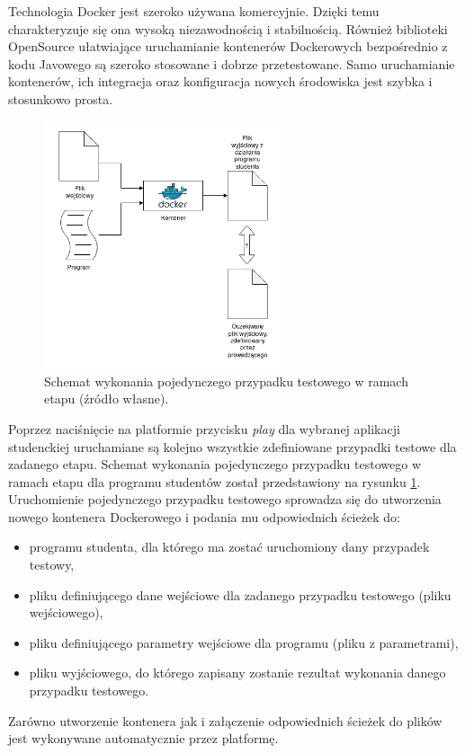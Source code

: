 Technologia Docker jest szeroko używana komercyjnie.
Dzięki temu charakteryzuje się ona wysoką niezawodnością i stabilnością.
Również biblioteki OpenSource ułatwiające uruchamianie kontenerów Dockerowych bezpośrednio z kodu Javowego są szeroko stosowane i dobrze przetestowane.
Samo uruchamianie kontenerów, ich integracja oraz konfiguracja nowych środowiska jest szybka i stosunkowo prosta.

\begin{figure}[h]
    \centering
    \includegraphics[width = 7cm]{chapter02/single_test_case.png}
    \caption{Schemat wykonania pojedynczego przypadku testowego w ramach etapu (źródło własne).}
    \label{fig:single-test-case}
\end{figure}

Poprzez naciśnięcie na platformie przycisku \textit{play} dla wybranej aplikacji studenckiej uruchamiane są kolejno wszystkie zdefiniowane przypadki testowe dla zadanego etapu.
Schemat wykonania pojedynczego przypadku testowego w ramach etapu dla programu studentów został przedstawiony na rysunku \ref{fig:single-test-case}.
Uruchomienie pojedynczego przypadku testowego sprowadza się do utworzenia nowego kontenera Dockerowego i podania mu odpowiednich ścieżek do:
\begin{itemize}
    \item programu studenta, dla którego ma zostać uruchomiony dany przypadek testowy,
    \item pliku definiującego dane wejściowe dla zadanego przypadku testowego (pliku wejściowego),
    \item pliku definiującego parametry wejściowe dla programu (pliku z parametrami),
    \item pliku wyjściowego, do którego zapisany zostanie rezultat wykonania danego przypadku testowego.
\end{itemize}
Zarówno utworzenie kontenera jak i załączenie odpowiednich ścieżek do plików jest wykonywane automatycznie przez platformę.

